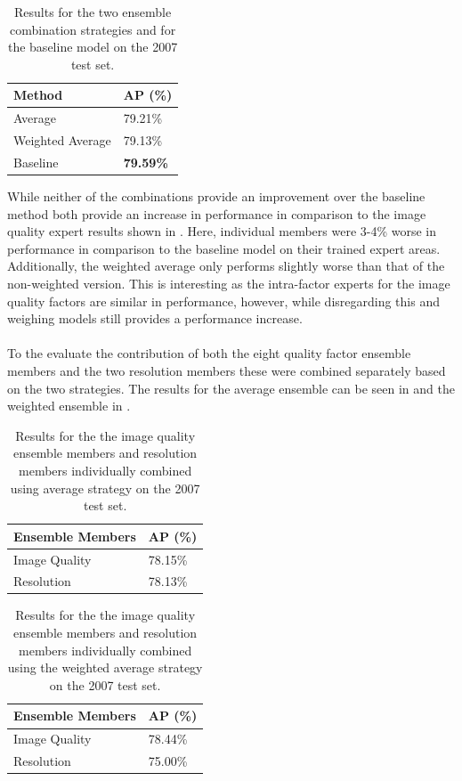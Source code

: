 \begin{table}[h]
\centering
\caption{Results for the two ensemble combination strategies and for the baseline model on the 2007 test set.}
\label{tab:avgres1}
\begin{tabular}{|l|l|}
\hline
\textbf{Method}           & \textbf{AP (\%)} \\ \hline
Average          & 79.21\% \\ \hline
Weighted Average & 79.13\% \\ \hline
Baseline         & \textbf{79.59\%} \\ \hline
\end{tabular}
\end{table}

While neither of the combinations provide an improvement over the baseline method both provide an increase in performance in comparison to the image quality expert results shown in . Here, individual members were 3-4\% worse in performance in comparison to the baseline model on their trained expert areas. Additionally, the weighted average only performs slightly worse than that of the non-weighted version. This is interesting as the intra-factor experts for the image quality factors are similar in performance, however, while disregarding this and weighing models still provides a performance increase.
\\\\
To the evaluate the contribution of both the eight quality factor ensemble members and the two resolution members these were combined separately based on the two strategies. The results for the average ensemble can be seen in  and the weighted ensemble in .

\begin{table}[h]
\centering
\caption{Results for the the image quality ensemble members and resolution members individually combined using average strategy on the 2007 test set.}
\label{tab:avgresind}
\begin{tabular}{|l|l|}
\hline
\textbf{Ensemble Members}        & \textbf{AP (\%)} \\ \hline
Image Quality & 78.15\% \\ \hline
Resolution    & 78.13\% \\ \hline
\end{tabular}
\end{table}

\begin{table}[h]
\centering
\caption{Results for the the image quality ensemble members and resolution members individually combined using the weighted average strategy on the 2007 test set.}
\label{tab:weiavgind}
\begin{tabular}{|l|l|}
\hline
\textbf{Ensemble Members}        & \textbf{AP (\%)} \\ \hline
Image Quality & 78.44\% \\ \hline
Resolution    & 75.00\% \\ \hline
\end{tabular}
\end{table}

